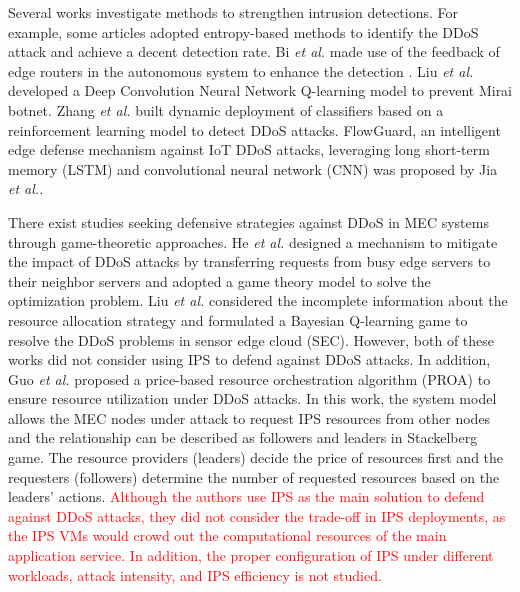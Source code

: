 \documentclass[10pt,journal, compsoc]{IEEEtran}
\begin{document}
Several works investigate methods to strengthen intrusion detections. For example, some articles adopted entropy-based methods to identify the DDoS attack and achieve a decent detection rate\cite{Wang}\cite{Xuanyuan}. Bi \emph{et al.} made use of the feedback of edge routers in the autonomous system to enhance the detection \cite{Bi}. Liu \emph{et al.} developed a Deep Convolution Neural Network Q-learning model to prevent Mirai botnet\cite{Liu}. Zhang \emph{et al.} built dynamic deployment of classifiers based on a reinforcement learning model to detect DDoS attacks\cite{Zhang}. FlowGuard, an intelligent edge defense mechanism against IoT DDoS attacks, leveraging long short-term memory (LSTM) and convolutional neural network (CNN) \cite{Jia} was proposed by Jia \emph{et al.}.

There exist studies seeking defensive strategies against DDoS in MEC systems through game-theoretic approaches. He \emph{et al.} designed a mechanism to mitigate the impact of DDoS attacks by transferring requests from busy edge servers to their neighbor servers and adopted a game theory model to solve the optimization problem\cite{He}. Liu \emph{et al.} considered the incomplete information about the resource allocation strategy and formulated a Bayesian Q-learning game to resolve the DDoS problems in sensor edge cloud (SEC)\cite{Liu3}. However, both of these works did not consider using IPS to defend against DDoS attacks. In addition, Guo \emph{et al.} proposed a price-based resource orchestration algorithm (PROA) to ensure resource utilization under DDoS attacks\cite{Guo2}. In this work, the system model allows the MEC nodes under attack to request IPS resources from other nodes and the relationship can be described as followers and leaders in Stackelberg game. The resource providers (leaders) decide the price of resources first and the requesters (followers) determine the number of requested resources based on the leaders' actions. \textcolor{red}{Although the authors use IPS as the main solution to defend against DDoS attacks, they did not consider the trade-off in IPS deployments, as the IPS VMs would crowd out the computational resources of the main application service. In addition, the proper configuration of IPS under different workloads, attack intensity, and IPS efficiency is not studied. }
\end{document}
